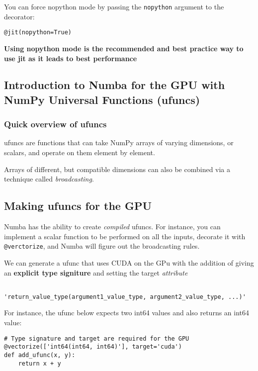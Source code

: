 \documentclass{article}
\begin{document}
You can force nopython mode by passing the \verb_nopython_ argument to the decorator:

\begin{verbatim}
@jit(nopython=True)
\end{verbatim}

\textbf{Using nopython mode is the recommended and best practice way to use jit as it leads to best performance}

\subsection{Introduction to Numba for the GPU with NumPy Universal Functions (ufuncs)}
\subsubsection{Quick overview of ufuncs}
ufuncs are functions that can take NumPy arrays of varying dimensions, or scalars, and operate on them element by element.

Arrays of different, but compatible dimensions can also be combined via a technique called \textit{broadcasting}.

\subsection{Making ufuncs for the GPU}
Numba has the ability to create \textit{compiled} ufuncs. For instance, you can implement a scalar function to be performed on all the inputs, decorate it with \verb_@verctorize_, and Numba will figure out the broadcasting rules. 

We can generate a ufunc that uses CUDA on the GPu with the addition of giving an \textbf{explicit type signiture} and setting the target \textit{attribute}

\begin{verbatim}

'return_value_type(argument1_value_type, argument2_value_type, ...)'

\end{verbatim}

For instance, the ufunc below expects two int64 values and also returns an int64 value:

\begin{verbatim}
# Type signature and target are required for the GPU
@vectorize(['int64(int64, int64)'], target='cuda') 
def add_ufunc(x, y):
    return x + y
\end{verbatim}
\end{document}
